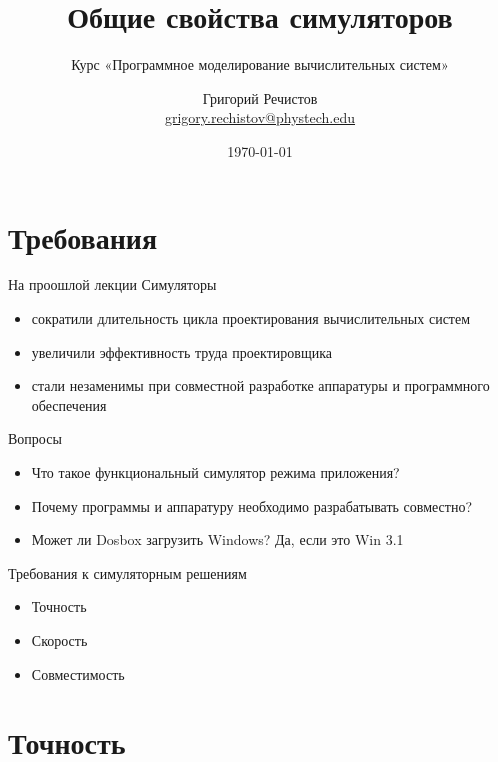 \documentclass{beamer}
\title{Общие свойства симуляторов}
\subtitle{Курс «Программное моделирование вычислительных систем»}
\author[]{Григорий Речистов \\ \small{\href{mailto:grigory.rechistov@phystech.edu}{grigory.rechistov@phystech.edu}}}
\date{\today}
\begin{document}
\begin{frame}
    \maketitle
\end{frame}

\begin{frame}
    \tableofcontents
\end{frame}

\section{Требования}

\begin{frame}{На проошлой лекции}
Симуляторы
\begin{itemize}
\item  сократили длительность цикла проектирования вычислительных систем
\item увеличили эффективность труда проектировщика
\item стали незаменимы при совместной разработке аппаратуры и программного обеспечения
\end{itemize}
\end{frame}

\begin{frame}{Вопросы}
\begin{itemize}
\item Что такое функциональный симулятор режима приложения?\pause 
\item Почему программы и аппаратуру необходимо разрабатывать совместно?\pause
\item Может ли Dosbox загрузить Windows? \pause Да, если это Win 3.1
\end{itemize}
\end{frame}


\begin{frame}{Требования к симуляторным решениям}
\begin{itemize}
\item Точность
\item Скорость
\item Совместимость
\end{itemize}
\end{frame}

\section{Точность}
\end{document}
